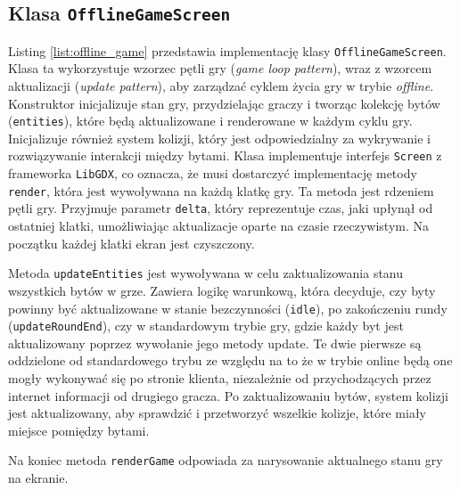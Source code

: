 \subsection{Klasa \texttt{OfflineGameScreen}}
Listing \ref{list:offline_game} przedstawia implementację klasy \texttt{OfflineGameScreen}. Klasa ta wykorzystuje wzorzec pętli gry (\emph{game loop pattern}), wraz z wzorcem aktualizacji (\emph{update pattern}), aby zarządzać cyklem życia gry w trybie \emph{offline}. Konstruktor inicjalizuje stan gry, przydzielając graczy i tworząc kolekcję bytów (\texttt{entities}), które będą aktualizowane i renderowane w każdym cyklu gry. Inicjalizuje również system kolizji, który jest odpowiedzialny za wykrywanie i rozwiązywanie interakcji między bytami. Klasa implementuje interfejs \texttt{Screen} z frameworka \texttt{LibGDX}, co oznacza, że musi dostarczyć implementację metody \texttt{render}, która jest wywoływana na każdą klatkę gry. Ta metoda jest rdzeniem pętli gry. Przyjmuje parametr \texttt{delta}, który reprezentuje czas, jaki upłynął od ostatniej klatki, umożliwiając aktualizacje oparte na czasie rzeczywistym. Na początku każdej klatki ekran jest czyszczony. 

Metoda \texttt{updateEntities} jest wywoływana w celu zaktualizowania stanu wszystkich bytów w grze. Zawiera logikę warunkową, która decyduje, czy byty powinny być aktualizowane w stanie bezczynności (\texttt{idle}), po zakończeniu rundy (\texttt{updateRoundEnd}), czy w standardowym trybie gry, gdzie każdy byt jest aktualizowany poprzez wywołanie jego metody update. Te dwie pierwsze są oddzielone od standardowego trybu ze względu na to że w trybie online będą one mogły wykonywać się po stronie klienta, niezależnie od przychodzących przez internet informacji od drugiego gracza. Po zaktualizowaniu bytów, system kolizji jest aktualizowany, aby sprawdzić i przetworzyć wszelkie kolizje, które miały miejsce pomiędzy bytami. 

Na koniec metoda \texttt{renderGame} odpowiada za narysowanie aktualnego stanu gry na ekranie.

